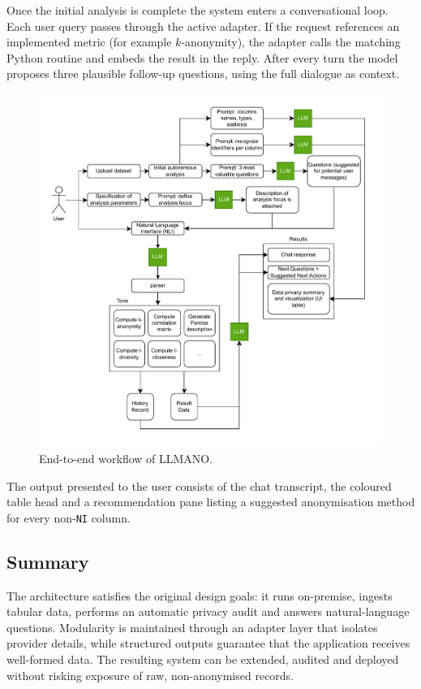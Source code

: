 \documentclass{article}
\begin{document}
Once the initial analysis is complete the system enters a conversational loop.  Each user query passes through the active adapter.  If the request references an implemented metric (for example \(k\)-anonymity), the adapter calls the matching Python routine and embeds the result in the reply.  After every turn the model proposes three plausible follow-up questions, using the full dialogue as context.

\begin{figure}[h]
    \centering
    \includegraphics[width=0.85\linewidth]{images/workflow_diagram.pdf}
    \caption{End-to-end workflow of LLMANO.}
    \label{fig:workflow-diagram}
\end{figure}

The output presented to the user consists of the chat transcript, the coloured table head and a recommendation pane listing a suggested anonymisation method for every non-\texttt{NI} column.

\subsection{Summary}

The architecture satisfies the original design goals: it runs on-premise, ingests tabular data, performs an automatic privacy audit and answers natural-language questions.  Modularity is maintained through an adapter layer that isolates provider details, while structured outputs guarantee that the application receives well-formed data.  The resulting system can be extended, audited and deployed without risking exposure of raw, non-anonymised records.
\end{document}
